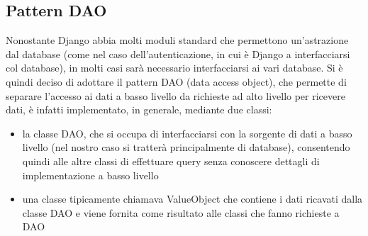 \subsection{Pattern DAO}
Nonostante Django abbia molti moduli standard che permettono un'astrazione dal database (come nel caso dell'autenticazione, in cui è Django a interfacciarsi col database), in molti casi sarà necessario interfacciarsi ai vari database. Si è quindi deciso di adottare il pattern DAO (data access object), che permette di separare l'accesso ai dati a basso livello da richieste ad alto livello per ricevere dati, è infatti implementato, in generale, mediante due classi:
\begin{itemize}
\item la classe DAO, che si occupa di interfacciarsi con la sorgente di dati a basso livello (nel nostro caso si tratterà principalmente di database), consentendo quindi alle altre classi di effettuare query senza conoscere dettagli di implementazione a basso livello
\item una classe tipicamente chiamava ValueObject che contiene i dati ricavati dalla classe DAO e viene fornita come risultato alle classi che fanno richieste a DAO
\end{itemize}
